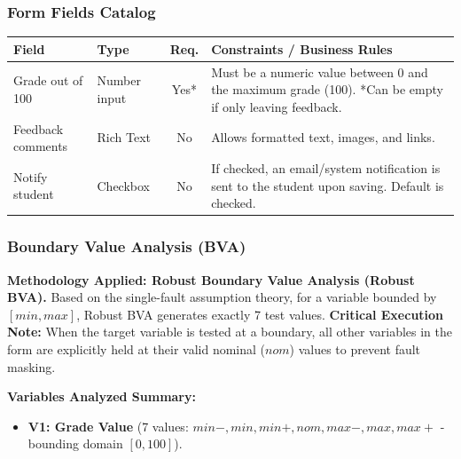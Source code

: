 \documentclass[twoside,final]{hcmut-report}
\begin{document}
\subsubsection{Form Fields Catalog}
\begin{table}[H]
\centering
\renewcommand{\arraystretch}{1.3}
\begin{tabularx}{\textwidth}{|l|l|c|X|}
\hline
\textbf{Field} & \textbf{Type} & \textbf{Req.} & \textbf{Constraints / Business Rules} \\ \hline
Grade out of 100 & Number input & Yes* & Must be a numeric value between 0 and the maximum grade (100). *Can be empty if only leaving feedback. \\ \hline
Feedback comments & Rich Text & No & Allows formatted text, images, and links. \\ \hline
Notify student & Checkbox & No & If checked, an email/system notification is sent to the student upon saving. Default is checked. \\ \hline
\end{tabularx}
\end{table}

\subsubsection{Boundary Value Analysis (BVA)}
\textbf{Methodology Applied: Robust Boundary Value Analysis (Robust BVA).} 
Based on the single-fault assumption theory, for a variable bounded by $[min, max]$, Robust BVA generates exactly 7 test values. \textbf{Critical Execution Note:} When the target variable is tested at a boundary, all other variables in the form are explicitly held at their valid nominal ($nom$) values to prevent fault masking.

\textbf{Variables Analyzed Summary:}
\begin{itemize}
    \item \textbf{V1: Grade Value} (7 values: $min-, min, min+, nom, max-, max, max+$ - bounding domain $[0, 100]$).
\end{itemize}
\end{document}
